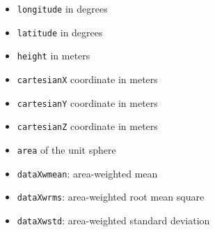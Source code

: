 \begin{itemize}
\item \verb|longitude| in degrees
\item \verb|latitude| in degrees
\item \verb|height| in meters
\item \verb|cartesianX| coordinate in meters
\item \verb|cartesianY| coordinate in meters
\item \verb|cartesianZ| coordinate in meters
\item \verb|area| of the unit sphere
\item \verb|dataXwmean|: area-weighted mean
\item \verb|dataXwrms|: area-weighted root mean square
\item \verb|dataXwstd|: area-weighted standard deviation
\end{itemize}

